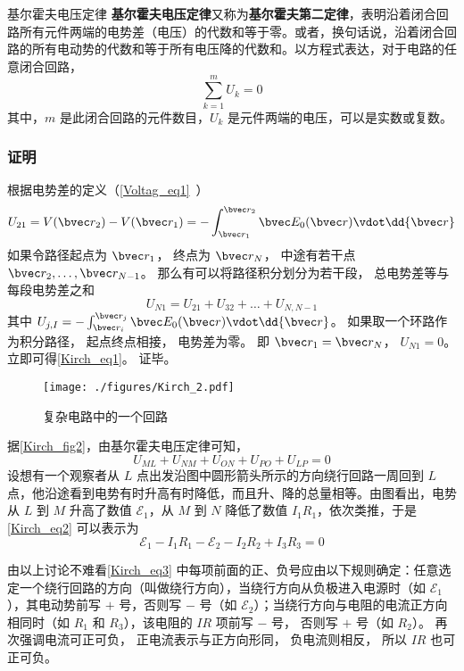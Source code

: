 \begin{theorem}{基尔霍夫电压定律}
\textbf{基尔霍夫电压定律}又称为\textbf{基尔霍夫第二定律}，表明沿着闭合回路所有元件两端的电势差（电压）的代数和等于零。或者，换句话说，沿着闭合回路的所有电动势的代数和等于所有电压降的代数和。以方程式表达，对于电路的任意闭合回路，
\begin{equation}\label{Kirch_eq1}
\sum_{k=1}^m U_k = 0
\end{equation}
其中，$m$ 是此闭合回路的元件数目，$U_k$ 是元件两端的电压，可以是实数或复数。
\end{theorem}

\subsubsection{证明}
根据电势差的定义（\autoref{Voltag_eq1}~）
\begin{equation}
U_{21} = V(\bvec r_2) - V(\bvec r_1) = - \int_{\bvec r_1}^{\bvec r_2} \bvec E_0(\bvec r) \vdot \dd{\bvec r}
\end{equation}
如果令路径起点为 $\bvec r_1$， 终点为 $\bvec r_N$， 中途有若干点 $\bvec r_2, \dots, \bvec r_{N-1}$。 那么有可以将路径积分划分为若干段， 总电势差等与每段电势差之和
\begin{equation}
U_{N1} = U_{21} + U_{32} + \dots + U_{N, N-1}
\end{equation}
其中 $U_{j, I} = - \int_{\bvec r_i}^{\bvec r_{j}} \bvec E_0(\bvec r) \vdot \dd{\bvec r}$。
如果取一个环路作为积分路径， 起点终点相接， 电势差为零。 即 $\bvec r_1 = \bvec r_N$， $U_{N1} = 0$。 立即可得\autoref{Kirch_eq1}。 证毕。

\begin{example}{}
\begin{figure}[ht]
\centering
\texttt{[image: ./figures/Kirch\_2.pdf]}
\caption{复杂电路中的一个回路} \label{Kirch_fig2}
\end{figure}

据\autoref{Kirch_fig2}，由基尔霍夫电压定律可知，
\begin{equation} \label{Kirch_eq2}
U_{M L}+U_{N M}+U_{O N}+U_{P O}+U_{L P}=0
\end{equation}
设想有一个观察者从 $L$ 点出发沿图中圆形箭头所示的方向绕行回路一周回到 $L $ 点，他沿途看到电势有时升高有时降低，而且升、降的总量相等。由图看出，电势从 $L $ 到 $M $ 升高了数值 $\mathscr E_1$，从 $M $ 到 $N $ 降低了数值 $I_1R_1$，依次类推，于是\autoref{Kirch_eq2} 可以表示为
\begin{equation}\label{Kirch_eq3}
\mathscr{E}_{1}-I_{1} R_{1}-\mathscr{E}_{2}-I_{2} R_{2}+I_{3} R_{3}=0
\end{equation}

由以上讨论不难看\autoref{Kirch_eq3} 中每项前面的正、负号应由以下规则确定：任意选定一个绕行回路的方向（叫做绕行方向），当绕行方向从负极进入电源时（如 $\mathscr E_1$），其电动势前写 $+$ 号，否则写 $-$ 号（如 $\mathscr
E_2$）；当绕行方向与电阻的电流正方向相同时（如 $R_1$ 和 $R_3$），该电阻的 $IR$ 项前写 $-$ 号， 否则写 $+$ 号（如 $R_2$）。 再次强调电流可正可负， 正电流表示与正方向形同， 负电流则相反， 所以 $IR$ 也可正可负。
\end{example}

